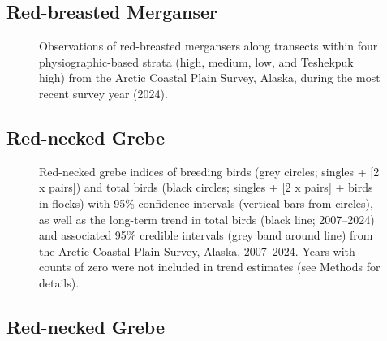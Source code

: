 \documentclass[
]{article}
\begin{document}
\endgroup{}

\newpage{}

\subsection*{Red-breasted Merganser}\label{red-breasted-merganser-2}

\begin{figure}


\caption{\label{fig-RBMEmap}Observations of red-breasted mergansers
along transects within four physiographic-based strata (high, medium,
low, and Teshekpuk high) from the Arctic Coastal Plain Survey, Alaska,
during the most recent survey year (2024).}

\end{figure}%

\newpage{}

\subsection*{Red-necked Grebe}\label{red-necked-grebe}

\begin{figure}


\caption{\label{fig-RNGR}Red-necked grebe indices of breeding birds
(grey circles; singles + {[}2 x pairs{]}) and total birds (black
circles; singles + {[}2 x pairs{]} + birds in flocks) with 95\%
confidence intervals (vertical bars from circles), as well as the
long-term trend in total birds (black line; 2007--2024) and associated
95\% credible intervals (grey band around line) from the Arctic Coastal
Plain Survey, Alaska, 2007--2024. Years with counts of zero were not
included in trend estimates (see Methods for details).}

\end{figure}%

\newpage{}

\subsection*{Red-necked Grebe}\label{red-necked-grebe-1}
\end{document}
